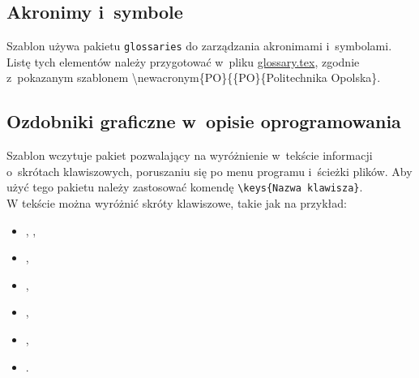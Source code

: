 \subsection{Akronimy i~symbole}
Szablon używa pakietu \texttt{glossaries} do zarządzania akronimami i~symbolami. Listę tych elementów należy przygotować w~pliku \href{./glossary.tex}{glossary.tex}, zgodnie z~pokazanym szablonem \textbackslash newacronym\{PO\}\{\{PO\}\{Politechnika Opolska\}.

\subsection{Ozdobniki graficzne w~opisie oprogramowania}
Szablon wczytuje pakiet pozwalający na wyróżnienie w~tekście informacji o~skrótach klawiszowych, poruszaniu się po menu programu i~ścieżki plików. Aby użyć tego pakietu należy zastosować komendę \texttt{\textbackslash keys{\{Nazwa klawisza\}}}.\\
W tekście można wyróżnić skróty klawiszowe, takie jak na przykład:
\begin{itemize} 
 	\item {}, \keys{\ctrl, \Alt, \del},
    \item {},
    \item \keys{\Space} \keys{\SPACE},
    \item \keys{\backspace} \keys{\del} \keys{\backdel},
    \item \keys{\return} \keys{\enter},
    \item \keys{\shift} \keys{\capslock}.
\end{itemize}

